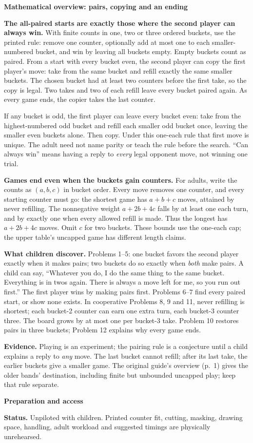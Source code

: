 \documentclass[11pt]{article}
\newcommand{\head}[1]{\par\textbf{\large #1}\par}
\begin{document}
\head{Mathematical overview: pairs, copying and an ending}
\textbf{The all-paired starts are exactly those where the second player can always win.} With finite counts in one, two or three ordered buckets, use the printed rule: remove one counter, optionally add at most one to each smaller-numbered bucket, and win by leaving all buckets empty. Empty buckets count as paired. From a start with every bucket even, the second player can copy the first player's move: take from the same bucket and refill exactly the same smaller buckets. The chosen bucket had at least two counters before the first take, so the copy is legal. Two takes and two of each refill leave every bucket paired again. As every game ends, the copier takes the last counter.

If any bucket is odd, the first player can leave every bucket even: take from the highest-numbered odd bucket and refill each smaller odd bucket once, leaving the smaller even buckets alone. Then copy. Under this one-each rule that first move is unique. The adult need not name parity or teach the rule before the search. ``Can always win'' means having a reply to \emph{every} legal opponent move, not winning one trial.

\textbf{Games end even when the buckets gain counters.} For adults, write the counts as $(a,b,c)$ in bucket order. Every move removes one counter, and every starting counter must go: the shortest game has $a+b+c$ moves, attained by never refilling. The nonnegative weight $a+2b+4c$ falls by at least one each turn, and by exactly one when every allowed refill is made. Thus the longest has $a+2b+4c$ moves. Omit $c$ for two buckets. These bounds use the one-each cap; the upper table's uncapped game has different length claims.

\textbf{What children discover.} Problems 1--5: one bucket favors the second player exactly when it makes pairs; two buckets do so exactly when \emph{both} make pairs. A child can say, ``Whatever you do, I do the same thing to the same bucket. Everything is in twos again. There is always a move left for me, so you run out first.'' The first player wins by making pairs first. Problems 6--7 find every paired start, or show none exists. In cooperative Problems 8, 9 and 11, never refilling is shortest; each bucket-2 counter can earn one extra turn, each bucket-3 counter three. The board grows by at most one per bucket-3 take. Problem 10 restores pairs in three buckets; Problem 12 explains why every game ends.

\textbf{Evidence.} Playing is an experiment; the pairing rule is a conjecture until a child explains a reply to \emph{any} move. The last bucket cannot refill; after its last take, the earlier buckets give a smaller game. The original guide's overview (p.\ 1) gives the older bands' destination, including finite but unbounded uncapped play; keep that rule separate.
\head{Preparation and access}
\textbf{Status.} Unpiloted with children. Printed counter fit, cutting, masking, drawing space, handling, adult workload and suggested timings are physically unrehearsed.
\end{document}
